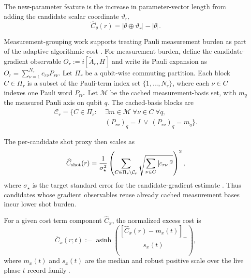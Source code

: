 \documentclass[
  reprint,
  amsmath,
  amssymb,
  aps,
  pra,
  nofootinbib,
  superscriptaddress,
  floatfix
]{revtex4-2}
\begin{document}
The new-parameter feature is the increase in parameter-vector length from adding the candidate scalar coordinate $\vartheta_r$,
\begin{equation}
\widehat C_\theta(r)
=
|\theta\oplus\vartheta_r|-|\theta|.
\label{eq:parameter_cost_proxy}
\end{equation}


Measurement-grouping work supports treating Pauli measurement burden as part of the adaptive algorithmic cost \cite{Verteletskyi2020CliqueCover,Yen2020CompatibleMeasurements}. For measurement burden, define the candidate-gradient observable \(O_r:=i[\widetilde A_r,H]\) and write its Pauli expansion as \(O_r=\sum_{\nu=1}^{N_r}c_{r\nu}P_{r\nu}\). Let \(\Pi_r\) be a qubit-wise commuting partition. Each block \(C\in\Pi_r\) is a subset of the Pauli-term index set \(\{1,\ldots,N_r\}\), where each \(\nu\in C\) indexes one Pauli word \(P_{r\nu}\). Let \(\mathcal M\) be the cached measurement-basis set, with \(m_q\) the measured Pauli axis on qubit \(q\). The cached-basis blocks are
\begin{equation}
\begin{aligned}
\mathcal C_r
=
\{C\in\Pi_r:\;&
\exists m\in\mathcal M\;
\forall \nu\in C\;
\forall q,\\
&
(P_{r\nu})_q=I
\ \lor\
(P_{r\nu})_q=m_q
\}.
\end{aligned}
\label{eq:cached_measurement_blocks}
\end{equation}

The per-candidate shot proxy then scales as
\begin{equation}
\widehat C_{\rm shot}(r)=
\frac{1}{\sigma_\star^2}
\left(
\sum_{C\in\Pi_r\setminus\mathcal C_r}
\sqrt{\sum_{\nu\in C}|c_{r\nu}|^2}
\right)^2,
\label{eq:shot_cost_proxy}
\end{equation}
where $\sigma_\star$ is the target standard error for the candidate-gradient estimate \cite{Ikhtiarudin2025ShotEfficient}. Thus candidates whose gradient observables reuse already cached measurement bases incur lower shot burden.


For a given cost term component $\widehat C_x$, the normalized excess cost is
\begin{equation}
\bar C_x(r;t):=
\operatorname{asinh}
\left(
\frac{[\widehat C_x(r)-m_x(t)]_+}{s_x(t)}
\right),
\label{eq:cost_robust_excess}
\end{equation}
where $m_x(t)$ and $s_x(t)$ are the median and robust positive scale over the live phase-$t$ record family \cite{IglewiczHoaglin1993,Burbidge1988IHS}.
\end{document}
